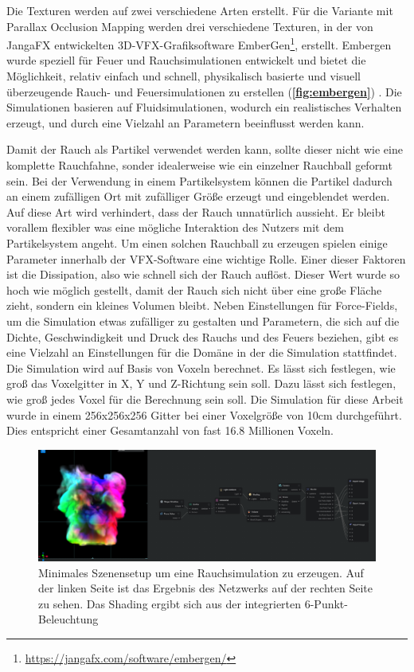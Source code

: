 Die Texturen werden auf zwei verschiedene Arten erstellt. Für die Variante mit Parallax Occlusion Mapping werden drei verschiedene
Texturen, in der von JangaFX entwickelten 3D-VFX-Grafiksoftware EmberGen\footnote{\url{https://jangafx.com/software/embergen/}}, erstellt.
Embergen wurde speziell für Feuer und Rauchsimulationen entwickelt und bietet die Möglichkeit, relativ einfach und schnell, physikalisch basierte und visuell
überzeugende Rauch- und Feuersimulationen zu erstellen (\textbf{\autoref{fig:embergen}}) .
Die Simulationen basieren auf Fluidsimulationen, wodurch ein realistisches Verhalten erzeugt, und durch eine Vielzahl an Parametern beeinflusst werden kann.

Damit der Rauch als Partikel verwendet werden kann, sollte dieser nicht wie eine komplette Rauchfahne, sonder idealerweise wie ein einzelner Rauchball geformt sein.
Bei der Verwendung in einem Partikelsystem können die Partikel dadurch an einem zufälligen Ort mit zufälliger Größe erzeugt und eingeblendet werden. Auf diese
Art wird verhindert, dass der Rauch unnatürlich aussieht. Er bleibt vorallem flexibler was eine mögliche Interaktion des Nutzers mit dem Partikelsystem angeht.
Um einen solchen Rauchball zu erzeugen spielen einige Parameter innerhalb der VFX-Software eine wichtige Rolle. Einer dieser Faktoren ist die Dissipation, also
wie schnell sich der Rauch auflöst. Dieser Wert wurde so hoch wie möglich gestellt, damit der Rauch sich nicht über eine große Fläche zieht, sondern ein kleines Volumen
bleibt. Neben Einstellungen für Force-Fields, um die Simulation etwas zufälliger zu gestalten und Parametern, die sich auf die Dichte, Geschwindigkeit und Druck des Rauchs
und des Feuers beziehen, gibt es eine Vielzahl an Einstellungen für die Domäne in der die Simulation stattfindet. Die Simulation wird auf Basis von Voxeln berechnet.
Es lässt sich festlegen, wie groß das Voxelgitter in X, Y und Z-Richtung sein soll. Dazu lässt sich festlegen, wie groß jedes Voxel für die Berechnung sein soll.
Die Simulation für diese Arbeit wurde in einem 256x256x256 Gitter bei einer Voxelgröße von 10cm durchgeführt. Dies entspricht einer Gesamtanzahl von fast 16.8 Millionen Voxeln.

\begin{figure}[h!]
	\includegraphics[width=\textwidth]{Grafiken/Implementation/embergen.png}
	\centering
	\begin{footnotesize}
		\caption{Minimales Szenensetup um eine Rauchsimulation zu erzeugen. Auf der linken Seite ist das Ergebnis des Netzwerks auf der rechten Seite zu sehen. Das Shading ergibt sich aus der
			integrierten 6-Punkt-Beleuchtung}
		\label{fig:embergen}
	\end{footnotesize}
\end{figure}

